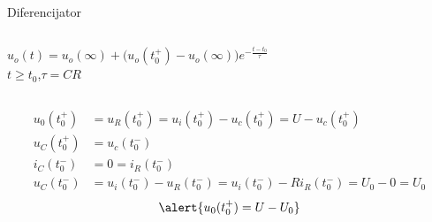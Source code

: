 \begin{frame}[label=08-s055]{Diferencijator}
\setlength{\parskip}{2pt}
\setlength{\abovedisplayskip}{4pt}\setlength{\belowdisplayskip}{4pt}
\begin{columns}[c,onlytextwidth]
\centering
{}
\[u_o(t)=u_o(\infty)+\bigl(u_o(t_0^+)-u_o(\infty)\bigr)e^{-\frac{t-t_0}{\tau}}\]
\centering $t\geq t_0$,\qquad $\tau=CR$
\end{columns}\smallskip
\begin{align*}
u_0(t_0^+)&=u_R(t_0^+)=u_i(t_0^+)-u_c(t_0^+)=U-u_c(t_0^+)\\
u_C(t_0^+)&=u_c(t_0^-)\\
i_C(t_0^-)&=0=i_R(t_0^-)\\
u_C(t_0^-)&=u_i(t_0^-)-u_R(t_0^-)=u_i(t_0^-)-Ri_R(t_0^-)=U_0-0=U_0
\end{align*}
\[\alert{u_0(t_0^+)=U-U_0}\]
\end{frame}
